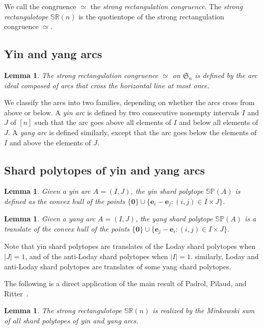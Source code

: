 \documentclass{amsart}
\newtheorem{lemma}[theorem]{Lemma}
\theoremstyle{definition}
\newcommand{\f}[1]{\mathfrak{#1}} %
\newcommand{\darkblue}{\color{darkblue}} %
\newcommand{\defn}[1]{\textsl{\darkblue #1}} %
\newcommand{\polytope}[1]{\mathds{#1}} %
\newcommand{\SRP}{\polytope{SR}} %
\newcommand{\SP}{\polytope{SP}}
\newcommand{\strongeq}{\simeq}%
\begin{document}
We call the congruence $\strongeq$ the \defn{strong rectangulation congruence}.
The \defn{strong rectangulotope} $\SRP(n)$ is the quotientope of the strong rectangulation congruence $\strongeq$.

\subsection{Yin and yang arcs}

\begin{lemma}
  The strong rectangulation congruence $\strongeq$ on $\f{S}_n$ is defined by the arc ideal composed of arcs that cross the horizontal line at most once.
\end{lemma}

We classify the arcs into two families, depending on whether the arcs cross from above or below.
A \defn{yin arc} is defined by two consecutive nonempty intervals $I$ and $J$ of $[n]$ such that the arc goes above all elements of $I$ and below all elements of $J$.
A \defn{yang arc} is defined similarly, except that the arc goes below the elements of $I$ and above the elements of $J$.

\subsection{Shard polytopes of yin and yang arcs}

\begin{lemma}
  \label{lem:yinsp}
  Given a yin arc $A=(I,J)$, the yin shard polytope $\SP(A)$ is defined as the convex hull of the points
  $\{\mathbf{0} \}\cup \{ \mathbf{e}_i - \mathbf{e}_j : (i,j)\in I\times J\}$.
\end{lemma}

\begin{lemma}
  \label{lem:yangsp}
  Given a yang arc $A=(I,J)$, the yang shard polytope $\SP(A)$ is a translate of the convex hull of the points
  $\{\mathbf{0} \}\cup \{ \mathbf{e}_j - \mathbf{e}_i : (i,j)\in I\times J\}$.
\end{lemma}

Note that yin shard polytopes are translates of the Loday shard polytopes when $|J|=1$, and of the anti-Loday shard polytopes when $|I|=1$.
similarly, Loday and anti-Loday shard polytopes are translates of some yang shard polytopes.

The following is a direct application of the main result of Padrol, Pilaud, and Ritter~\cite{MR4584712}.

\begin{lemma}
  \label{lem:strongsum}
  The strong rectangulotope $\SRP(n)$ is realized by the Minkowski sum of all shard polytopes of yin and yang arcs.
\end{lemma}
\end{document}
